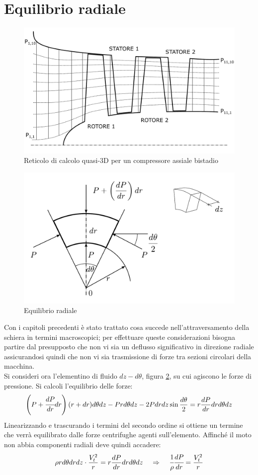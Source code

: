 \section{Equilibrio radiale}
\begin{figure}
\centering
  \includegraphics[width=.8\textwidth]{fig/ReticoloComp.pdf}
\caption{Reticolo di calcolo quasi-3D per un compressore assiale bistadio}
\label{fig:ReticoloComp}
\end{figure}
\begin{figure}
\centering
  \includegraphics[width=.6\textwidth]{fig/concio.pdf}
\caption{Equilibrio radiale}
\label{fig:concio}
\end{figure}
Con i capitoli precedenti è stato trattato cosa succede nell'attraversamento della schiera in termini macroscopici; per effettuare queste considerazioni bisogna partire dal presupposto che non vi sia un deflusso significativo in direzione radiale assicurandosi quindi che non vi sia trasmissione di forze tra sezioni circolari della macchina.\\
Si consideri ora l'elementino di fluido $dz - d\theta$, figura \ref{fig:concio}, su cui agiscono le forze di pressione. Si calcoli l'equilibrio delle forze:
\begin{align*}
\left( P + \cfrac{dP}{dr} dr \right) (r + dr) d \theta dz - Pr d \theta dz -2P dr dz \sin \frac{d \theta}{2} = r \frac{dP}{dr} dr d \theta dz
\end{align*}
Linearizzando e trascurando i termini del secondo ordine si ottiene un termine che verrà equilibrato dalle forze centrifughe agenti sull'elemento. Affinché il moto non abbia componenti radiali deve quindi accadere:
\begin{equation}
\rho r d \theta dr dz \cdot \frac{V_t^2}{r} = r \frac{dP}{dr} dr d \theta dz \;\;\;\; \Rightarrow \;\;\;\; \cfrac{1}{\rho} \cfrac{dP}{dr} = \frac{V_t^2}{r}
\label{eq:EquilibrioRad}
\end{equation}
